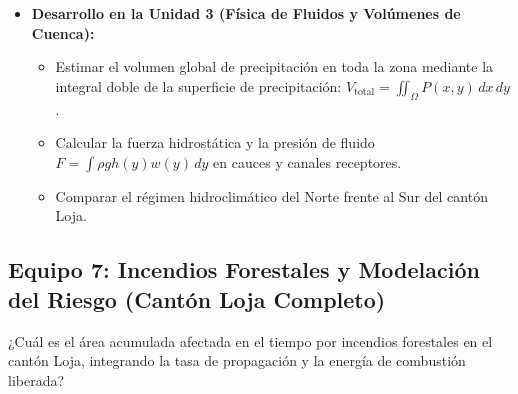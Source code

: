 \documentclass[11pt,a4paper]{article}
\begin{document}
\begin{itemize}[leftmargin=*,itemsep=1.5pt]
\begin{itemize}
    \item Resolver analíticamente las integrales de balance hídrico utilizando el método de sustitución y fracciones parciales en modelos de retención del suelo.
  \end{itemize}
  \item \textbf{Desarrollo en la Unidad 3 (Física de Fluidos y Volúmenes de Cuenca):}
  \begin{itemize}
    \item Estimar el volumen global de precipitación en toda la zona mediante la integral doble de la superficie de precipitación: $V_{\text{total}} = \iint_{\Omega} P(x,y)\,dx\,dy$.
    \item Calcular la fuerza hidrostática y la presión de fluido $F = \int \rho g h(y) w(y)\,dy$ en cauces y canales receptores.
    \item Comparar el régimen hidroclimático del Norte frente al Sur del cantón Loja.
  \end{itemize}
\end{itemize}

\subsection{Equipo 7: Incendios Forestales y Modelación del Riesgo (Cantón Loja Completo)}
\begin{guidelinebox}[title=Pregunta Guía Central]
¿Cuál es el área acumulada afectada en el tiempo por incendios forestales en el cantón Loja, integrando la tasa de propagación y la energía de combustión liberada?
\end{guidelinebox}
\end{document}
